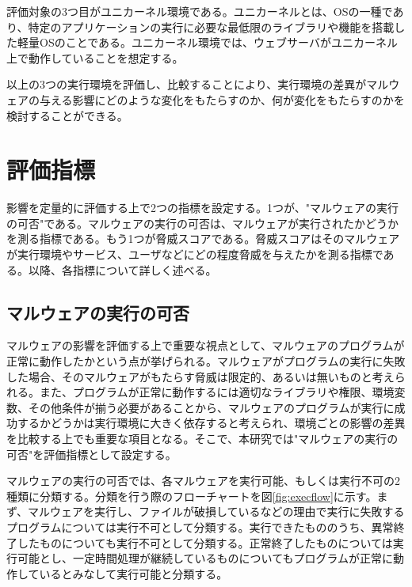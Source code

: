 \documentclass[12pt,a4paper,titlepage,report]{jsbook}
\begin{document}
評価対象の3つ目がユニカーネル環境である。ユニカーネルとは、OSの一種であり、特定のアプリケーションの実行に必要な最低限のライブラリや機能を搭載した軽量OSのことである。ユニカーネル環境では、ウェブサーバがユニカーネル上で動作していることを想定する。

以上の3つの実行環境を評価し、比較することにより、実行環境の差異がマルウェアの与える影響にどのような変化をもたらすのか、何が変化をもたらすのかを検討することができる。

\section{評価指標}
影響を定量的に評価する上で2つの指標を設定する。1つが、"マルウェアの実行の可否"である。マルウェアの実行の可否は、マルウェアが実行されたかどうかを測る指標である。もう1つが脅威スコアである。脅威スコアはそのマルウェアが実行環境やサービス、ユーザなどにどの程度脅威を与えたかを測る指標である。以降、各指標について詳しく述べる。

\subsection{マルウェアの実行の可否}
マルウェアの影響を評価する上で重要な視点として、マルウェアのプログラムが正常に動作したかという点が挙げられる。マルウェアがプログラムの実行に失敗した場合、そのマルウェアがもたらす脅威は限定的、あるいは無いものと考えられる。また、プログラムが正常に動作するには適切なライブラリや権限、環境変数、その他条件が揃う必要があることから、マルウェアのプログラムが実行に成功するかどうかは実行環境に大きく依存すると考えられ、環境ごとの影響の差異を比較する上でも重要な項目となる。そこで、本研究では"マルウェアの実行の可否"を評価指標として設定する。

マルウェアの実行の可否では、各マルウェアを実行可能、もしくは実行不可の2種類に分類する。分類を行う際のフローチャートを図\ref{fig:execflow}に示す。まず、マルウェアを実行し、ファイルが破損しているなどの理由で実行に失敗するプログラムについては実行不可として分類する。実行できたもののうち、異常終了したものについても実行不可として分類する。正常終了したものについては実行可能とし、一定時間処理が継続しているものについてもプログラムが正常に動作しているとみなして実行可能と分類する。
\end{document}
